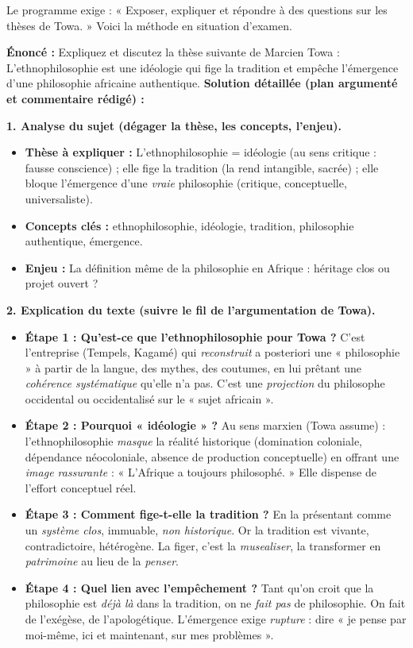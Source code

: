 \documentclass[11pt]{article}
\begin{document}
Le programme exige : « Exposer, expliquer et répondre à des questions sur les thèses de Towa. » Voici la méthode en situation d'examen.

\begin{exoresolu}
\textbf{Énoncé :} \guillemotleft Expliquez et discutez la thèse suivante de Marcien Towa : \guillemotleft L'ethnophilosophie est une idéologie qui fige la tradition et empêche l'émergence d'une philosophie africaine authentique. \guillemotright \guillemotright
\tcblower
\textbf{Solution détaillée (plan argumenté et commentaire rédigé) :}

\medskip
\noindent \textbf{1. Analyse du sujet (dégager la thèse, les concepts, l'enjeu).}
\begin{itemize}
\item \textbf{Thèse à expliquer :} L'ethnophilosophie = idéologie (au sens critique : fausse conscience) ; elle fige la tradition (la rend intangible, sacrée) ; elle bloque l'émergence d'une \emph{vraie} philosophie (critique, conceptuelle, universaliste).
\item \textbf{Concepts clés :} ethnophilosophie, idéologie, tradition, philosophie authentique, émergence.
\item \textbf{Enjeu :} La définition même de la philosophie en Afrique : héritage clos ou projet ouvert ?
\end{itemize}

\medskip
\noindent \textbf{2. Explication du texte (suivre le fil de l'argumentation de Towa).}
\begin{itemize}
\item \textbf{Étape 1 : Qu'est-ce que l'ethnophilosophie pour Towa ?} C'est l'entreprise (Tempels, Kagamé) qui \emph{reconstruit} a posteriori une « philosophie » à partir de la langue, des mythes, des coutumes, en lui prêtant une \emph{cohérence systématique} qu'elle n'a pas. C'est une \emph{projection} du philosophe occidental ou occidentalisé sur le « sujet africain ».
\item \textbf{Étape 2 : Pourquoi « idéologie » ?} Au sens marxien (Towa assume) : l'ethnophilosophie \emph{masque} la réalité historique (domination coloniale, dépendance néocoloniale, absence de production conceptuelle) en offrant une \emph{image rassurante} : « L'Afrique a toujours philosophé. » Elle dispense de l'effort conceptuel réel.
\item \textbf{Étape 3 : Comment fige-t-elle la tradition ?} En la présentant comme un \emph{système clos}, immuable, \emph{non historique}. Or la tradition est vivante, contradictoire, hétérogène. La figer, c'est la \emph{musealiser}, la transformer en \emph{patrimoine} au lieu de la \emph{penser}.
\item \textbf{Étape 4 : Quel lien avec l'empêchement ?} Tant qu'on croit que la philosophie est \emph{déjà là} dans la tradition, on ne \emph{fait pas} de philosophie. On fait de l'exégèse, de l'apologétique. L'émergence exige \emph{rupture} : dire « je pense par moi-même, ici et maintenant, sur mes problèmes ».
\end{itemize}


\end{exoresolu}
\end{document}
